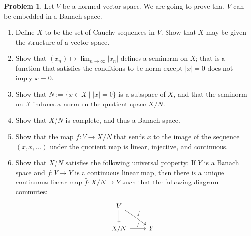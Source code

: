\documentclass[11pt]{article}
\theoremstyle{definition}
\newtheorem{prob}{Problem}
\begin{document}
\begin{prob}
Let $V$ be a normed vector space.
We are going to prove that $V$ can be embedded in a Banach space.
\begin{enumerate}
\item
Define $X$ to be the set of Cauchy sequences in $V$.
Show that $X$ may be given the structure of a vector space.

\item
Show that $(x_n) \mapsto \lim_{n \to \infty} |x_n|$ defines a seminorm on $X$;
that is a function that satisfies the conditions to be norm except $|x| = 0$
does not imply $x = 0$.

\item
Show that $N := \{ x \in X \mid |x| = 0 \}$ is a subspace of $X$, and that
the seminorm on $X$ induces a norm on the quotient space $X / N$.

\item
Show that $X / N$ is complete, and thus a Banach space.

\item
Show that the map $f : V \to X / N$ that sends $x$ to the image of the sequence
$(x,x,\ldots)$ under the quotient map is linear, injective, and continuous.

\item
Show that $X / N$ satisfies the following universal property:
If $Y$ is a Banach space and $f : V \to Y$ is a continuous linear map, then
there is a unique continuous linear map $\hat f : X/N \to Y$ such that the
following diagram commutes:
\[
\begin{tikzcd}
V \ar[dr,"f"] \ar[d] &
\\
X/N \ar[r,"\hat{f}"] & Y
\end{tikzcd}
\]
\end{enumerate}
\end{prob}
\end{document}
